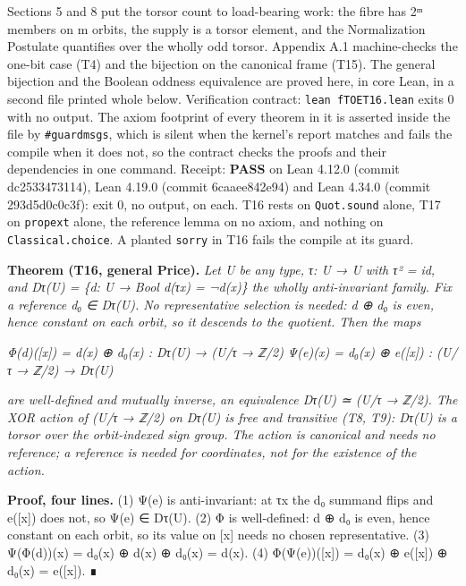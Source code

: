 \documentclass[10pt]{article}
\renewcommand{\_}{\origunderscore\allowbreak}
\begin{document}
Sections 5 and 8 put the torsor count to load-bearing work: the fibre
has 2ᵐ members on m orbits, the supply is a torsor element, and the
Normalization Postulate quantifies over the wholly odd torsor. Appendix
A.1 machine-checks the one-bit case (T4) and the bijection on the
canonical frame (T15). The general bijection and the Boolean oddness
equivalence are proved here, in core Lean, in a second file printed
whole below. Verification contract: \texttt{lean\ fTOE\_T16.lean} exits
0 with no output. The axiom footprint of every theorem in it is asserted
inside the file by \texttt{\#guard\_msgs}, which is silent when the
kernel's report matches and fails the compile when it does not, so the
contract checks the proofs and their dependencies in one command.
Receipt: \textbf{PASS} on Lean 4.12.0 (commit dc2533473114), Lean 4.19.0
(commit 6caaee842e94) and Lean 4.34.0 (commit 293d5d0c0c3f): exit 0, no
output, on each. T16 rests on \texttt{Quot.sound} alone, T17 on
\texttt{propext} alone, the reference lemma on no axiom, and nothing on
\texttt{Classical.choice}. A planted \texttt{sorry} in T16 fails the
compile at its guard.

\textbf{Theorem (T16, general Price).} \emph{Let U be any type, τ: U → U
with τ² = id, and Dτ(U) = \{d: U → Bool \textbar{} d(τx) = ¬d(x)\} the
wholly anti-invariant family. Fix a reference d₀ ∈ Dτ(U). No
representative selection is needed: d ⊕ d₀ is even, hence constant on
each orbit, so it descends to the quotient. Then the maps}

\emph{Φ(d)({[}x{]}) = d(x) ⊕ d₀(x) : Dτ(U) → (U/τ → ℤ/2)} \emph{Ψ(e)(x)
= d₀(x) ⊕ e({[}x{]}) : (U/τ → ℤ/2) → Dτ(U)}

\emph{are well-defined and mutually inverse, an equivalence Dτ(U) ≃ (U/τ
→ ℤ/2). The XOR action of (U/τ → ℤ/2) on Dτ(U) is free and transitive
(T8, T9): Dτ(U) is a torsor over the orbit-indexed sign group. The
action is canonical and needs no reference; a reference is needed for
coordinates, not for the existence of the action.}

\textbf{Proof, four lines.} (1) Ψ(e) is anti-invariant: at τx the d₀
summand flips and e({[}x{]}) does not, so Ψ(e) ∈ Dτ(U). (2) Φ is
well-defined: d ⊕ d₀ is even, hence constant on each orbit, so its value
on {[}x{]} needs no chosen representative. (3) Ψ(Φ(d))(x) = d₀(x) ⊕ d(x)
⊕ d₀(x) = d(x). (4) Φ(Ψ(e))({[}x{]}) = d₀(x) ⊕ e({[}x{]}) ⊕ d₀(x) =
e({[}x{]}). ∎
\end{document}
